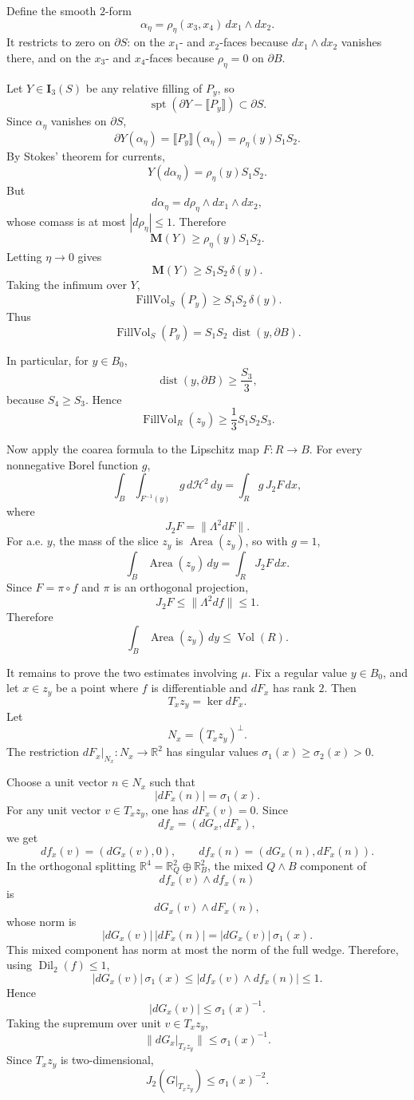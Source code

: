 \documentclass[12pt]{article}
\begin{document}
Define the smooth \(2\)-form
\[
\alpha_\eta=\rho_\eta(x_3,x_4)\,dx_1\wedge dx_2.
\]
It restricts to zero on \(\partial S\): on the \(x_1\)- and \(x_2\)-faces because \(dx_1\wedge dx_2\) vanishes there, and on the \(x_3\)- and \(x_4\)-faces because \(\rho_\eta=0\) on \(\partial B\).

Let \(Y\in\mathbf I_3(S)\) be any relative filling of \(P_y\), so
\[
\operatorname{spt}(\partial Y-\llbracket P_y\rrbracket)\subset \partial S.
\]
Since \(\alpha_\eta\) vanishes on \(\partial S\),
\[
\partial Y(\alpha_\eta)
=
\llbracket P_y\rrbracket(\alpha_\eta)
=
\rho_\eta(y)S_1S_2.
\]
By Stokes’ theorem for currents,
\[
Y(d\alpha_\eta)=\rho_\eta(y)S_1S_2.
\]
But
\[
d\alpha_\eta=d\rho_\eta\wedge dx_1\wedge dx_2,
\]
whose comass is at most \(|d\rho_\eta|\le 1\). Therefore
\[
\mathbf M(Y)\ge \rho_\eta(y)S_1S_2.
\]
Letting \(\eta\to 0\) gives
\[
\mathbf M(Y)\ge S_1S_2\,\delta(y).
\]
Taking the infimum over \(Y\),
\[
\operatorname{FillVol}_S(P_y)\ge S_1S_2\,\delta(y).
\]
Thus
\[
\operatorname{FillVol}_S(P_y)=S_1S_2\,\operatorname{dist}(y,\partial B).
\]

In particular, for \(y\in B_0\),
\[
\operatorname{dist}(y,\partial B)\ge \frac{S_3}{3},
\]
because \(S_4\ge S_3\). Hence
\[
\operatorname{FillVol}_R(z_y)\ge \frac13 S_1S_2S_3.
\]

Now apply the coarea formula to the Lipschitz map \(F:R\to B\). For every nonnegative Borel function \(g\),
\[
\int_B\int_{F^{-1}(y)} g\,d\mathcal H^2\,dy
=
\int_R g\,J_2F\,dx,
\]
where
\[
J_2F=\|\Lambda^2 dF\|.
\]
For a.e. \(y\), the mass of the slice \(z_y\) is \(\operatorname{Area}(z_y)\), so with \(g=1\),
\[
\int_B \operatorname{Area}(z_y)\,dy
=
\int_R J_2F\,dx.
\]
Since \(F=\pi\circ f\) and \(\pi\) is an orthogonal projection,
\[
J_2F\le \|\Lambda^2df\|\le 1.
\]
Therefore
\[
\int_B \operatorname{Area}(z_y)\,dy
\le
\operatorname{Vol}(R).
\]

It remains to prove the two estimates involving \(\mu\). Fix a regular value \(y\in B_0\), and let \(x\in z_y\) be a point where \(f\) is differentiable and \(dF_x\) has rank \(2\). Then
\[
T_xz_y=\ker dF_x.
\]
Let
\[
N_x=(T_xz_y)^\perp.
\]
The restriction \(dF_x|_{N_x}:N_x\to\mathbb R^2\) has singular values \(\sigma_1(x)\ge \sigma_2(x)>0\).

Choose a unit vector \(n\in N_x\) such that
\[
|dF_x(n)|=\sigma_1(x).
\]
For any unit vector \(v\in T_xz_y\), one has \(dF_x(v)=0\). Since
\[
df_x=(dG_x,dF_x),
\]
we get
\[
df_x(v)=(dG_x(v),0),
\qquad
df_x(n)=(dG_x(n),dF_x(n)).
\]
In the orthogonal splitting \(\mathbb R^4=\mathbb R^2_Q\oplus\mathbb R^2_B\), the mixed \(Q\wedge B\) component of
\[
df_x(v)\wedge df_x(n)
\]
is
\[
dG_x(v)\wedge dF_x(n),
\]
whose norm is
\[
|dG_x(v)|\,|dF_x(n)|
=
|dG_x(v)|\,\sigma_1(x).
\]
This mixed component has norm at most the norm of the full wedge. Therefore, using \(\operatorname{Dil}_2(f)\le 1\),
\[
|dG_x(v)|\,\sigma_1(x)
\le
|df_x(v)\wedge df_x(n)|
\le 1.
\]
Hence
\[
|dG_x(v)|\le \sigma_1(x)^{-1}.
\]
Taking the supremum over unit \(v\in T_xz_y\),
\[
\|dG_x|_{T_xz_y}\|\le \sigma_1(x)^{-1}.
\]
Since \(T_xz_y\) is two-dimensional,
\[
J_2(G|_{T_xz_y})\le \sigma_1(x)^{-2}.
\]
\end{document}
